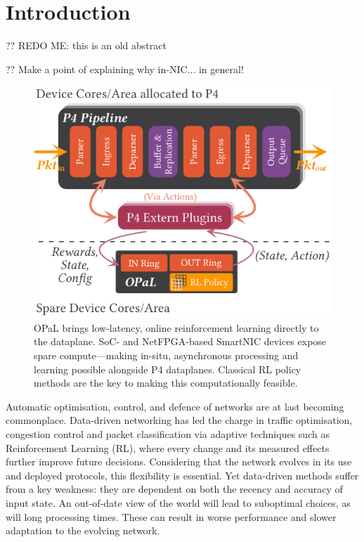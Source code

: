 \documentclass[sigconf,natbib=false]{acmart}
\newcommand{\approachshort}{OPaL}
\begin{document}
	
\maketitle

\setlength{\aweboxleftmargin}{0.12\linewidth}
\setlength{\aweboxcontentwidth}{1.97\linewidth}
	
\section{Introduction}
?? REDO ME: this is an old abstract

?? Make a point of explaining why in-NIC... in general!

\begin{figure}
	\centering
	\includegraphics[keepaspectratio, width=0.9\linewidth]{figures/arch-with-p4}
	\caption{\approachshort{} brings low-latency, online reinforcement learning directly to the dataplane. SoC- and NetFPGA-based SmartNIC devices expose spare compute---making in-situ, asynchronous processing and learning possible alongside P4 dataplanes. Classical RL policy methods are the key to making this computationally feasible.\label{fig:netro-arch}}
\end{figure}

Automatic optimisation, control, and defence of networks are at last becoming commonplace. Data-driven networking has led the charge in traffic optimisation, congestion control and packet classification via adaptive techniques such as Reinforcement Learning (RL), where every change and its measured effects further improve future decisions. Considering that the network evolves in its use and deployed protocols, this flexibility is essential. Yet data-driven methods suffer from a key weakness: they are dependent on both the recency and accuracy of input state. An out-of-date view of the world will lead to suboptimal choices, as will long processing times. These can result in worse performance and slower adaptation to the evolving network.
\end{document}
